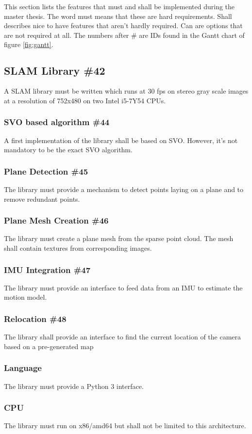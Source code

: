 \documentclass[11pt,a4paper,titlepage,oneside]{report}
\begin{document}
This section lists the features that must and shall be implemented during the master thesis. The word must means that these are hard requirements. Shall describes nice to have features that aren't hardly required. Can are options that are not required at all. The numbers after \# are IDs found in the Gantt chart of figure \ref{fig:gantt}.

\subsection{SLAM Library \#42}
A SLAM library must be written which runs at 30 fps on stereo gray scale images at a resolution of 752x480 on two Intel i5-7Y54 CPUs.
\subsubsection{SVO based algorithm \#44}
A first implementation of the library shall be based on SVO. However, it's not mandatory to be the exact SVO algorithm.
\subsubsection{Plane Detection \#45}
The library must provide a mechanism to detect points laying on a plane and to remove redundant points.
\subsubsection{Plane Mesh Creation \#46}
The library must create a plane mesh from the sparse point cloud. The mesh shall contain textures from corresponding images.
\subsubsection{IMU Integration \#47}
The library must provide an interface to feed data from an IMU to estimate the motion model.
\subsubsection{Relocation \#48}
The library shall provide an interface to find the current location of the camera based on a pre-generated map
\subsubsection{Language}
The library must provide a Python 3 interface.
\subsubsection{CPU}
The library must run on x86/amd64 but shall not be limited to this architecture.
\end{document}
